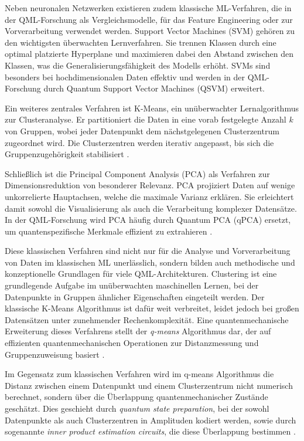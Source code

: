 \noindent  
Neben neuronalen Netzwerken existieren zudem klassische ML-Verfahren, die in der QML-Forschung als Vergleichsmodelle, für das Feature Engineering oder zur Vorverarbeitung verwendet werden. Support Vector Machines (SVM) gehören zu den wichtigsten überwachten Lernverfahren. Sie trennen Klassen durch eine optimal platzierte Hyperplane und maximieren dabei den Abstand zwischen den Klassen, was die Generalisierungsfähigkeit des Modells erhöht. SVMs sind besonders bei hochdimensionalen Daten effektiv und werden in der QML-Forschung durch Quantum Support Vector Machines (QSVM) erweitert. \cite{janiesch_machine_2021} 

\noindent  
Ein weiteres zentrales Verfahren ist K-Means, ein unüberwachter Lernalgorithmus zur Clusteranalyse. Er partitioniert die Daten in eine vorab festgelegte Anzahl $k$ von Gruppen, wobei jeder Datenpunkt dem nächstgelegenen Clusterzentrum zugeordnet wird. Die Clusterzentren werden iterativ angepasst, bis sich die Gruppenzugehörigkeit stabilisiert \cite{janiesch_machine_2021}.

\noindent  
Schließlich ist die Principal Component Analysis (PCA) als Verfahren zur Dimensionsreduktion von besonderer Relevanz. PCA projiziert Daten auf wenige unkorrelierte Hauptachsen, welche die maximale Varianz erklären. Sie erleichtert damit sowohl die Visualisierung als auch die Verarbeitung komplexer Datensätze. In der QML-Forschung wird PCA häufig durch Quantum PCA (qPCA) ersetzt, um quantenspezifische Merkmale effizient zu extrahieren \cite{janiesch_machine_2021}. 

\noindent  
Diese klassischen Verfahren sind nicht nur für die Analyse und Vorverarbeitung von Daten im klassischen ML unerlässlich, sondern bilden auch methodische und konzeptionelle Grundlagen für viele QML-Architekturen. Clustering ist eine grundlegende Aufgabe im unüberwachten maschinellen Lernen, bei der Datenpunkte in Gruppen ähnlicher Eigenschaften eingeteilt werden. Der klassische K-Means Algorithmus ist dafür weit verbreitet, leidet jedoch bei großen Datensätzen unter zunehmender Rechenkomplexität. Eine quantenmechanische Erweiterung dieses Verfahrens stellt der \textit{q-means} Algorithmus dar, der auf effizienten quantenmechanischen Operationen zur Distanzmessung und Gruppenzuweisung basiert \cite{kerenidis_q-means_2019}. 

\noindent  
Im Gegensatz zum klassischen Verfahren wird im q-means Algorithmus die Distanz zwischen einem Datenpunkt und einem Clusterzentrum nicht numerisch berechnet, sondern über die Überlappung quantenmechanischer Zustände geschätzt. Dies geschieht durch \textit{quantum state preparation}, bei der sowohl Datenpunkte als auch Clusterzentren in Amplituden kodiert werden, sowie durch sogenannte \textit{inner product estimation circuits}, die diese Überlappung bestimmen \cite{kerenidis_q-means_2019}.

